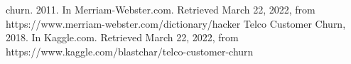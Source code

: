 \documentclass[letterpaper, 10 pt, conference]{ieeeconf}
\begin{document}
\begin{thebibliography}{99}
\bibitem{} churn. 2011. In Merriam-Webster.com. Retrieved March 22, 2022, from https://www.merriam-webster.com/dictionary/hacker
\bibitem{} Telco Customer Churn, 2018. In Kaggle.com. Retrieved March 22, 2022, from https://www.kaggle.com/blastchar/telco-customer-churn
\end{thebibliography}

\end{document}
